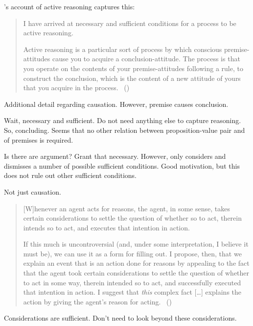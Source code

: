 \begin{note}
  \citeauthor{Broome:2013aa}'s account of active reasoning captures this:
  \begin{quote}
    I have arrived at necessary and sufficient conditions for a process to be active reasoning.

    Active reasoning is a particular sort of process by which conscious premise-attitudes cause you to acquire a conclusion-attitude.
    The process is that you operate on the contents of your premise-attitudes following a rule, to construct the conclusion, which is the content of a new attitude of yours that you acquire in the process.%
    \mbox{ }\hfill\mbox{(\citeyear[234]{Broome:2013aa})}
  \end{quote}
  Additional detail regarding causation.
  However, premise causes conclusion.

  Wait, necessary and sufficient.
  Do not need anything else to capture reasoning.
  So, concluding.
  Seems that no other relation between proposition-value pair and \poP{} of premises is required.

  Is there are argument?
  Grant that necessary.
  However, \citeauthor{Broome:2013aa} only considers and dismisses a number of possible sufficient conditions.
  Good motivation, but this does not rule out other sufficient conditions.
\end{note}

\begin{note}
  Not just causation.

  \begin{quote}
    [W]henever an agent acts for reasons, the agent, in some sense, takes certain considerations to settle the question of whether so to act, therein intends so to act, and executes that intention in action.

    If this much is uncontroversial (and, under some interpretation, I believe it must be), we can use it as a form for filling out.
    I propose, then, that we explain an event that is an action done for reasons by appealing to the fact that the agent took certain considerations to settle the question of whether to act in some way, therein intended so to act, and successfully executed that intention in action.
    I suggest that \emph{this} complex fact [\dots] explains the action by giving the agent's reason for acting.%
    \mbox{ }\hfill\mbox{(\citeyear[421]{Hieronymi:2011aa})}
  \end{quote}

  Considerations are sufficient.
  Don't need to look beyond these considerations.
\end{note}

